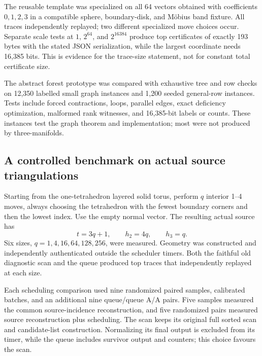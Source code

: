 The reusable template was specialized on all 64 vectors obtained with
coefficients $0,1,2,3$ in a compatible sphere, boundary-disk, and M\"obius
band fixture. All traces independently replayed; two different specialized
move choices occur. Separate scale tests at $1$, $2^{64}$, and $2^{16384}$
produce top certificates of exactly 193 bytes with the stated JSON
serialization, while the largest coordinate needs 16,385 bits. This is
evidence for the trace-size statement, not for constant total certificate
size.

The abstract forest prototype was compared with exhaustive tree and row
checks on 12,350 labelled small graph instances and 1,200 seeded general-row
instances. Tests include forced contractions, loops, parallel edges, exact
deficiency optimization, malformed rank witnesses, and 16,385-bit labels or
counts. These instances test the graph theorem and implementation; most
were not produced by three-manifolds.

\subsection{A controlled benchmark on actual source triangulations}

Starting from the one-tetrahedron layered solid torus, perform $q$ interior
1--4 moves, always choosing the tetrahedron with the fewest boundary
corners and then the lowest index. Use the empty normal vector. The resulting
actual source has
\[
 t=3q+1,\qquad h_2=4q,\qquad h_3=q.
\]
Six sizes, $q=1,4,16,64,128,256$, were measured. Geometry was constructed and
independently authenticated outside the scheduler timers. Both the faithful
old diagnostic scan and the queue produced top traces that independently
replayed at each size.

Each scheduling comparison used nine randomized paired samples, calibrated
batches, and an additional nine queue/queue A/A pairs. Five samples measured
the common source-incidence reconstruction, and five randomized pairs
measured source reconstruction plus scheduling. The scan keeps its original
full sorted scan and candidate-list construction. Normalizing its final
output is excluded from its timer, while the queue includes survivor output
and counters; this choice favours the scan.

\begin{table}[H]
\centering\small

\caption{Ratios are scan median divided by queue median. The combined
stage reconstructs source incidence for both methods. It excludes initial
parallelity construction, source-proof authentication, and terminal
recognition. Values below one are regressions.}
\label{tab:timing}
\end{table}

